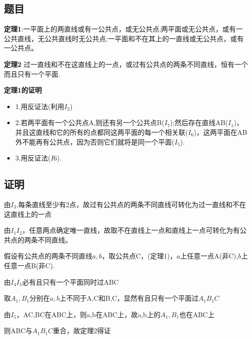 \documentclass[12pt]{ctexart}
\begin{document}
\subsection{题目}
\textbf{定理1}:一平面上的两直线或有一公共点，或无公共点;两平面或无公共点，或有一公共直线，无公共直线时无公共点;一平面和不在其上的一直线或无公共点，或有一公共点。

\textbf{定理2} 过一直线和不在这直线上的一点，或过有公共点的两条不同直线，恒有一个而且只有一个平面.

\textbf{定理1的证明}
\begin{itemize}
    \item 1.用反证法(利用$I_2$)
    \item 2.若两平面有一个公共点A,则还有另一个公共点B($I_7$);然后存在直线AB($I_1$)，并且这直线和它的所有的点都同这两平面的每一个相关联($I_6$)，这两平面在AB 外不能再有公共点，因为否则它们就将是同一个平面($I_5$).
    \item 3.用反证法($I6$).
\end{itemize}
\subsection{证明}
由$I_3$,每条直线至少有2点，故过有公共点的两条不同直线可转化为过一直线和不在这直线上的一点

由$I_1I_2$，任意两点确定唯一直线，故取不在直线上一点和直线上一点可转化为有公共点的两条不同直线。

假设有公共点的两条不同直线$a,b$，取公共点C，(定理1)，$a$上任意一点A(非C),$b$上任意一点B(非C).

由$I_4I_5$必有且只有一个平面同时过ABC

取$A_1,B_1$分别在$a,b$上不同于A,C和B,C，显然有且只有一个平面过$A_1B_1C$

由$I_5$，AC,BC在ABC上，则a,b在ABC上，故a,b上的$A_1,B_1$也在ABC上

则ABC与$A_1B_1C$重合，故定理2得证
\end{document}
